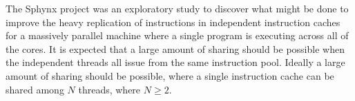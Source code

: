 The Sphynx project was an exploratory study to discover what might be
done to improve the heavy replication of instructions in independent
instruction caches for a massively parallel machine where a single
program is executing across all of the cores. 
It is expected that a large amount of sharing should be possible when
the independent threads all issue from the same instruction pool.
Ideally a large amount of sharing should be possible, where a single
instruction cache can be shared among $N$ threads, where $N\geq 2$.
